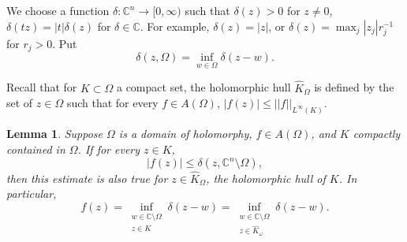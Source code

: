 \documentclass[12pt]{report}
\newcommand{\CC}{\mathbb{C}}
\newtheorem{lemma}[theorem]{Lemma}
\theoremstyle{definition}
\begin{document}
We choose a function $\delta: \CC^n \to [0, \infty)$ such that $\delta(z) > 0$ for $z \neq 0$, $\delta(tz) = |t|\delta(z)$ for $\delta \in \CC$. For example, $\delta(z) = |z|$, or $\delta(z) = \max_j |z_j|r_j^{-1}$ for $r_j > 0$. Put
$$\delta(z, \Omega) = \inf_{w \in \Omega} \delta(z - w).$$

Recall that for $K \subset \Omega$ a compact set, the holomorphic hull $\hat K_\Omega$ is defined by the set of $z \in \Omega$ such that for every $f \in A(\Omega)$, $|f(z)| \leq ||f||_{L^\infty(K)}$.

\begin{lemma}
    Suppose $\Omega$ is a domain of holomorphy, $f \in A(\Omega)$, and $K$ compactly contained in $\Omega$. If for every $z \in K$,
    $$|f(z)| \leq \delta(z, \CC^n \setminus \Omega),$$
    then this estimate is also true for $z \in \hat K_\Omega$, the holomorphic hull of $K$. In particular, 
    $$f(z) = \inf_{\substack{w \in \CC \setminus \Omega\\z \in K}} \delta(z - w) = \inf_{\substack{w \in \CC \setminus \Omega\\z \in \hat K_\omega}}
 \delta(z - w).$$\end{lemma}
\end{document}
